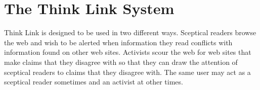 \documentclass{chi2009}
\begin{document}
%

\section{The Think Link System}

Think Link is designed to be used in two different ways. Sceptical readers browse the web and wish to be alerted when information they read conflicts with information found on other web sites. Activists scour the web for web sites that make claims that they disagree with so that they can draw the attention of sceptical readers to claims that they disagree with. The same user may act as a sceptical reader sometimes and an activist at other times.
\end{document}
